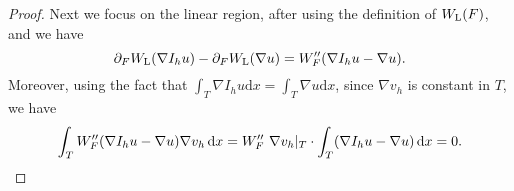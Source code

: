 \begin{proof}
	
	
	
	
	
	Next we focus on the linear region, after using the definition of $W_{{\rm L}}(F)$, and we have
	\begin{equation*}
		\partial_{F} W_{\text{L}}(\nabla I_{h} u) - \partial_{F} W_{\text{L}}(\nabla u) =W^{\prime \prime}_F(\nabla I_{h}u - \nabla u).
	\end{equation*}
	Moreover, using the fact that $\int_{T} \nabla I_{h}u \text{d}x = \int_{T} \nabla u\text{d}x$, since $\nabla v_{h} $ is constant in $T$, we have
	\begin{equation*}
		\begin{aligned}
			\int_{T} W^{\prime \prime}_F (\nabla I_{h}u - \nabla u) \nabla v_{h} \,\text{d}x = W^{\prime \prime}_F \  \nabla v_{h}\vert_{T} \cdot \int_{T} (\nabla I_{h}u - \nabla u)\,\text{d}x= 0.
		\end{aligned}
	\end{equation*}
	

\end{proof}
